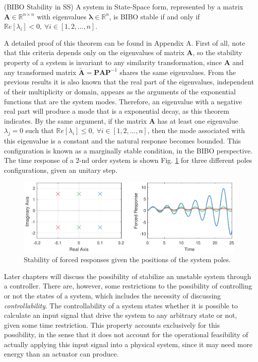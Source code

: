 \documentclass[a4paper,11pt]{book}
\numberwithin{figure}{chapter}
\numberwithin{equation}{chapter}
\numberwithin{table}{chapter}
\newtheorem{theorem}{Theorem}[chapter]
\theoremstyle{definition}
\newcounter{boxed-theorem}
\newenvironment{boxed-theorem}[1]
{\begin{shaded} \begin{theorem}{#1}}
{\end{theorem} \end{shaded}}
\newcounter{boxed-definition}
\begin{document}
\begin{boxed-theorem}{(BIBO Stability in SS)} \label{th:BIBOStab}
    A system in State-Space form, represented by a matrix $\bm{A} \in \mathbb{R}^{n \times n}$ with eigenvalues $\bm{\lambda} \in \mathbb{R}^n$, is BIBO stable if and only if $\mathbb{R}e[\lambda_i] < 0,\ \forall i \in [1,2,...,n]$.
\end{boxed-theorem}

A detailed proof of this theorem can be found in Appendix A. First of all, note that this criteria depends only on the eigenvalues of matrix $\bm{A}$, so the stability property of a system is invariant to any similarity transformation, since $\bm{A}$ and any transformed matrix $\tilde{\bm{A}} = \bm{P} \bm{A} \bm{P}^{-1}$ shares the same eigenvalues. From the previous results it is also known that the real part of the eigenvalues, independent of their multiplicity or domain, appears as the arguments of the exponential functions that are the system modes. Therefore, an eigenvalue with a negative real part will produce a mode that is a exponential decay, as this theorem indicates. By the same argument, if the matrix $\bm{A}$ has at least one eigenvalue $\lambda_j = 0$ such that $\mathbb{R}e[\lambda_i] \leq 0,\ \forall i \in [1,2,...,n]$, then the mode associated with this eigenvalue is a constant and the natural response becomes bounded. This configuration is known as a marginally stable condition, in the BIBO perspective. The time response of a $2$-nd order system is shown Fig. \ref{fig:stability01} for three different poles configurations, given an unitary step.

\begin{figure}[ht]
    \centering
    \includegraphics[width=\textwidth]{chapter2/stability01}
    \caption{Stability of forced responses given the positions of the system poles.}
    \label{fig:stability01}
\end{figure} 

Later chapters will discuss the possibility of stabilize an unstable system through a controller. There are, however, some restrictions to the possibility of controlling or not the states of a system, which includes the necessity of discussing \textit{controllability}. The controllability of a system states whether it is possible to calculate an input signal that drive the system to any arbitrary state or not, given some time restriction. This property accounts exclusively for this possibility, in the sense that it does not account for the operational feasibility of actually applying this input signal into a physical system, since it may need more energy than an actuator can produce. 
\end{document}
